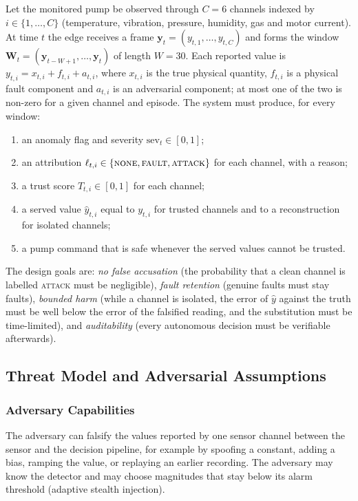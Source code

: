 \documentclass[11pt,a4paper]{article}
\begin{document}
Let the monitored pump be observed through $C = 6$ channels indexed by $i \in \{1, \dots, C\}$ (temperature, vibration, pressure, humidity, gas and motor current). At time $t$ the edge receives a frame $\mathbf{y}_t = (y_{t,1}, \dots, y_{t,C})$ and forms the window $\mathbf{W}_t = (\mathbf{y}_{t-W+1}, \dots, \mathbf{y}_t)$ of length $W = 30$. Each reported value is $y_{t,i} = x_{t,i} + f_{t,i} + a_{t,i}$, where $x_{t,i}$ is the true physical quantity, $f_{t,i}$ is a physical fault component and $a_{t,i}$ is an adversarial component; at most one of the two is non-zero for a given channel and episode. The system must produce, for every window:

\begin{enumerate}
  \item an anomaly flag and severity $\mathrm{sev}_t \in [0,1]$;
  \item an attribution $\ell_{t,i} \in \{\textsc{none}, \textsc{fault}, \textsc{attack}\}$ for each channel, with a reason;
  \item a trust score $T_{t,i} \in [0,1]$ for each channel;
  \item a served value $\hat{y}_{t,i}$ equal to $y_{t,i}$ for trusted channels and to a reconstruction for isolated channels;
  \item a pump command that is safe whenever the served values cannot be trusted.
\end{enumerate}

The design goals are: \emph{no false accusation} (the probability that a clean channel is labelled \textsc{attack} must be negligible), \emph{fault retention} (genuine faults must stay faults), \emph{bounded harm} (while a channel is isolated, the error of $\hat{y}$ against the truth must be well below the error of the falsified reading, and the substitution must be time-limited), and \emph{auditability} (every autonomous decision must be verifiable afterwards).

\subsection{Threat Model and Adversarial Assumptions}

\subsubsection{Adversary Capabilities}

The adversary can falsify the values reported by one sensor channel between the sensor and the decision pipeline, for example by spoofing a constant, adding a bias, ramping the value, or replaying an earlier recording. The adversary may know the detector and may choose magnitudes that stay below its alarm threshold (adaptive stealth injection).
\end{document}
